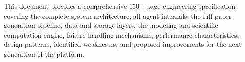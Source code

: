 \documentclass[12pt,a4paper,twoside]{report}
\theoremstyle{definition}
\theoremstyle{remark}
\begin{document}
This document provides a comprehensive 150+ page engineering specification covering the complete system architecture, all agent internals, the full paper generation pipeline, data and storage layers, the modeling and scientific computation engine, failure handling mechanisms, performance characteristics, design patterns, identified weaknesses, and proposed improvements for the next generation of the platform.

\clearpage

{
\hypersetup{linkcolor=adark}
\tableofcontents
}
\clearpage

\listoffigures
\clearpage

\listoftables
\clearpage

\listofalgorithms
\clearpage

\printglossary[type=\acronymtype,title=List of Acronyms]
\clearpage



































\end{document}
